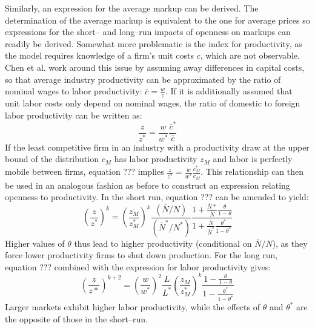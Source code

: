 \documentclass[a4paper,12pt]{article}
\begin{document}
Similarly, an expression for the average markup can be derived. The determination of the average markup is equivalent to the one for average prices so expressions for the short-- and long--run impacts of openness on markups can readily be derived. Somewhat more problematic is the index for productivity, as the model requires knowledge of a firm's unit costs $c$, which are not observable. Chen et al. work around this issue by assuming away differences in capital costs, so that average industry productivity can be approximated by the ratio of nominal wages to labor productivity: $\bar{c} = \frac{w}{z}$. If it is additionally assumed that unit labor costs only depend on nominal wages, the ratio of domestic to foreign labor productivity can be written as:
\begin{equation}\label{eq:chen-lab-prod}
\frac{z}{z^*} = \frac{w}{w^*} \frac{\bar{c}^*}{\bar{c}}
\end{equation}
If the least competitive firm in an industry with a productivity draw at the upper bound of the distribution $c_M$ has labor productivity $z_M$ and labor is perfectly mobile between firms, equation ??? implies $\frac{z}{z^*} = \frac{w}{w^*} \frac{c_M^*}{c_M}$. This relationship can then be used in an analogous fashion as before to construct an expression relating openness to productivity. In the short run, equation ??? can be amended to yield:
\begin{equation}\label{eq:chen-prod-sr}
\left( \frac{z}{z^*} \right)^k = \left( \frac{z_M}{z_M^*} \right)^k \frac{(\bar{N}/N)}{(\bar{N}^*/N^*)} \frac{1+ \frac{\bar{N}*}{\bar{N}} \frac{\theta}{1-\theta}}{1+ \frac{\bar{N}}{\bar{N}^*} \frac{\theta^*}{1-\theta^*}} 
\end{equation}
Higher values of $\theta$ thus lead to higher productivity (conditional on $\bar{N}/N$), as they force lower productivity firms to shut down production. For the long run, equation ??? combined with the expression for labor productivity gives:
\begin{equation}\label{eq:chen-prod-lr}
\left( \frac{z}{z*} \right)^{k+2} = \left( \frac{w}{w^*} \right)^2 \frac{L}{L^*} \left( \frac{z_M}{z_M^*} \right)^k \frac{1-\frac{\theta}{1-\theta}}{1-\frac{\theta^*}{1-\theta^*}}
\end{equation} 
Larger markets exhibit higher labor productivity, while the effects of $\theta$ and $\theta^*$ are the opposite of those in the short--run.

\end{document}
